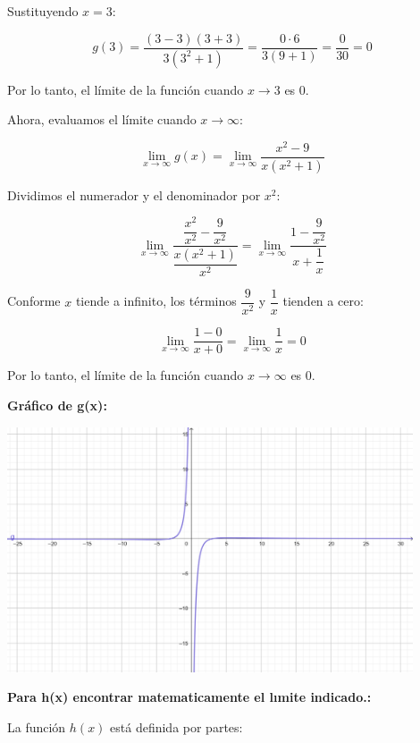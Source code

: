 \documentclass[answers]{exam} %
\begin{document}
\begin{questions}
\begin{solution}
		Sustituyendo \( x = 3 \):

		\[
			g(3) = \frac{(3 - 3)(3 + 3)}{3(3^2 + 1)} = \frac{0 \cdot 6}{3(9 + 1)} = \frac{0}{30} = 0
		\]

		Por lo tanto, el límite de la función cuando \( x \rightarrow 3 \) es \( 0 \).

		Ahora, evaluamos el límite cuando \( x \rightarrow \infty \):

		\[
			\lim_{{x \to \infty}} g(x) = \lim_{{x \to \infty}} \frac{x^2 - 9}{x(x^2 + 1)}
		\]

		Dividimos el numerador y el denominador por \( x^2 \):

		\[
			\lim_{{x \to \infty}} \dfrac{\dfrac{x^2}{x^2} - \dfrac{9}{x^2}}{\dfrac{x(x^2 + 1)}{x^2}} = \lim_{{x \to \infty}} \dfrac{1 - \dfrac{9}{x^2}}{x + \dfrac{1}{x}}
		\]

		Conforme \( x \) tiende a infinito, los términos $\displaystyle \dfrac{9}{x^2}$ y $\displaystyle \dfrac{1}{x}$ tienden a cero:

		\[
			\lim_{{x \to \infty}} \dfrac{1 - 0}{x + 0} = \lim_{{x \to \infty}} \dfrac{1}{x} = 0
		\]

		Por lo tanto, el límite de la función cuando \( x \rightarrow \infty \) es \( 0 \).
	\end{solution}
	\newpage
	\large\textbf{Gráfico de g(x):}\\[1em]
	\begin{minipage}{\textwidth}
		\centering
		\includegraphics[width=0.9\textwidth]{public/g2.png}\\
	\end{minipage}

	\vspace{1cm}
    
	\large\textbf{Para h(x) encontrar matematicamente el lımite indicado.:}
	\begin{solution}
		La función \( h(x) \) está definida por partes:


\end{solution}
\end{questions}
\end{document}
